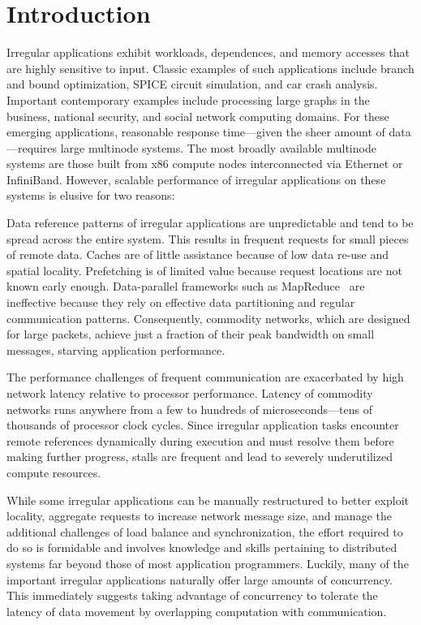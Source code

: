 \section{Introduction} \label{sec:intro}

Irregular applications exhibit workloads, dependences, and memory accesses
that are highly sensitive to input. Classic examples of such applications
include branch and bound optimization, SPICE circuit simulation, and car crash
analysis. Important contemporary examples include processing large graphs in
the business, national security, and social network computing domains. For
these emerging applications, reasonable response time---given the sheer
amount of data---requires large multinode systems. The most broadly available
multinode systems are those built from x86 compute nodes interconnected via
Ethernet or InfiniBand. However, scalable performance of irregular
applications on these systems is elusive for two reasons:

\vspace{0.5ex}
 Data reference patterns of irregular applications are unpredictable and tend to be spread across the entire system. This results in frequent requests for small pieces of remote data. Caches are of little assistance because of low data re-use and spatial locality. Prefetching is of limited value because request locations are not known early enough. Data-parallel frameworks such as MapReduce~\cite{mapreduce:osdi04} are ineffective because they rely on effective data partitioning and regular communication patterns. Consequently, commodity networks, which are designed for large packets, achieve just a fraction of their peak bandwidth on small messages, starving application performance.

\vspace{0.5ex}  The performance challenges of frequent communication are exacerbated by high network latency relative to processor performance. Latency of commodity networks runs anywhere from a few to hundreds of microseconds---tens of thousands of processor clock cycles.  Since irregular application tasks encounter remote references dynamically during execution and must resolve them before making further progress, stalls are frequent and lead to severely underutilized compute resources.

While some irregular applications can be manually restructured to better exploit locality, aggregate requests to increase network message size, and manage the additional challenges of load balance and synchronization, the effort required to do so is formidable and involves knowledge and skills pertaining to distributed systems far beyond those of most application programmers. Luckily, many of the important irregular applications naturally offer large amounts of concurrency. This immediately suggests taking advantage of concurrency to tolerate the latency of data movement by overlapping computation with communication.

